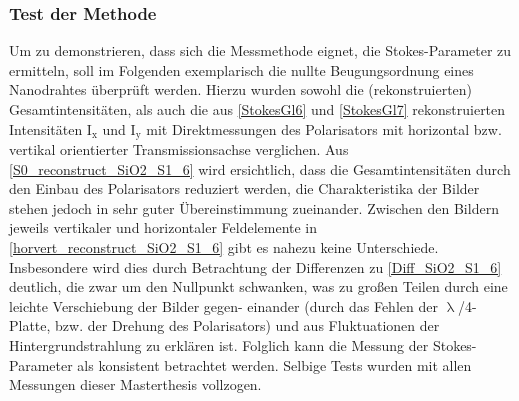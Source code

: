 \subsubsection{Test der Methode}
Um zu demonstrieren, dass sich die Messmethode eignet, die Stokes-Parameter zu ermitteln, soll im Folgenden exemplarisch die nullte Beugungsordnung eines \mbox{Nanodrahtes} überprüft werden. Hierzu wurden sowohl die (rekonstruierten) Gesamtintensitäten, als auch die aus \autoref{StokesGl6} und \autoref{StokesGl7} rekonstruierten Intensitäten I$_\text{x}$ und I$_\text{y}$ mit Direktmessungen des Polarisators mit horizontal bzw. vertikal orientierter Transmissionsachse verglichen. Aus \autoref{S0_reconstruct_SiO2_S1_6} wird ersichtlich, dass die Gesamtintensitäten durch den Einbau des Polarisators reduziert werden, die Charakteristika der Bilder stehen jedoch in sehr guter Übereinstimmung zueinander. Zwischen den Bildern jeweils vertikaler und horizontaler Feldelemente in \autoref{horvert_reconstruct_SiO2_S1_6} gibt es nahezu keine Unterschiede. 
Insbesondere wird dies durch Betrachtung der Differenzen zu \autoref {Diff_SiO2_S1_6} deutlich, die zwar um den Nullpunkt schwanken, was zu großen Teilen durch eine leichte Verschiebung der Bilder gegen- einander (durch das Fehlen der $\uplambda$/4-Platte, bzw. der Drehung des Polarisators) und aus Fluktuationen der Hintergrundstrahlung zu erklären ist. Folglich kann die Messung der Stokes-Parameter als konsistent betrachtet werden. Selbige Tests wurden mit allen Messungen dieser Masterthesis vollzogen.

